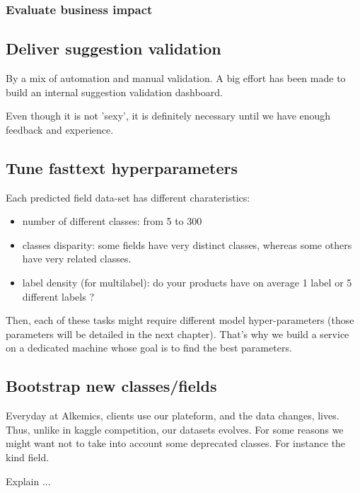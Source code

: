 \subsubsection{Evaluate business impact}

\subsection{Deliver suggestion validation}

By a mix of automation and manual validation.
A big effort has been made to build an internal suggestion validation dashboard. 

Even though it is not 'sexy', it is definitely necessary until we have enough feedback and experience.

\subsection{Tune fasttext hyperparameters}

Each predicted field data-set has different charateristics:
\begin{itemize}
	\item number of different classes: from 5 to 300
	\item classes disparity: some fields have very distinct classes, whereas some others have very related classes.
	\item label density (for multilabel): do your products have on average 1 label or 5 different labels ?
\end{itemize}

Then, each of these tasks might require different model hyper-parameters (those parameters will be detailed in the next chapter).
That's why we build a service on a dedicated machine whose goal is to find the best parameters.

\subsection{Bootstrap new classes/fields}

Everyday at Alkemics, clients use our plateform, and the data changes, lives. Thus, unlike in kaggle competition, our datasets evolves.
For some reasons we might want not to take into account some deprecated classes. For instance the kind field.

Explain ...


